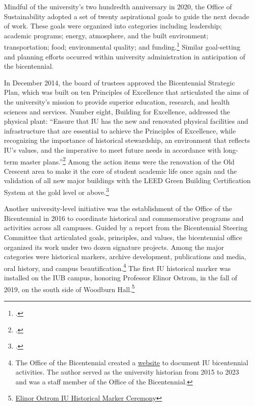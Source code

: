 \documentclass[
  american,
  letterpaper,
]{scrreprt}
\begin{document}
Mindful of the university's two hundredth anniversary in 2020, the
Office of Sustainability adopted a set of twenty aspirational goals to
guide the next decade of work. These goals were organized into
categories including leadership; academic programs; energy, atmosphere,
and the built environment; transportation; food; environmental quality;
and funding.\footnote{.}
Similar goal-setting and planning efforts occurred within university
administration in anticipation of the bicentennial.

In December 2014, the board of trustees approved the Bicentennial
Strategic Plan, which was built on ten Principles of Excellence that
articulated the aims of the university's mission to provide superior
education, research, and health sciences and services. Number eight,
Building for Excellence, addressed the physical plant: ``Ensure that IU
has the new and renovated physical facilities and infrastructure that
are essential to achieve the Principles of Excellence, while recognizing
the importance of historical stewardship, an environment that reflects
IU's values, and the imperative to meet future needs in accordance with
long-term master plans.''\footnote{.}
Among the action items were the renovation of the Old Crescent area to
make it the core of student academic life once again and the validation
of all new major buildings with the LEED Green Building Certification
System at the gold level or above.\footnote{.}

Another university-level initiative was the establishment of the Office
of the Bicentennial in 2016 to coordinate historical and commemorative
programs and activities across all campuses. Guided by a report from the
Bicentennial Steering Committee that articulated goals, principles, and
values, the bicentennial office organized its work under two dozen
signature projects. Among the major categories were historical markers,
archive development, publications and media, oral history, and campus
beautification.\footnote{The Office of the Bicentennial created a
  \href{https://web.archive.org/web/20170427181106/https://200.iu.edu/}{website}
  to document IU bicentennial activities. The author served as the
  university historian from 2015 to 2023 and was a staff member of the
  Office of the Bicentennial.} The first IU historical marker was
installed on the IUB campus, honoring Professor Elinor Ostrom, in the
fall of 2019, on the south side of Woodburn Hall.\footnote{\href{https://web.archive.org/web/20210624095353/https://honorsandawards.iu.edu/awards/honoree/1071.html}{Elinor
  Ostrom IU Historical Marker Ceremony}}
\end{document}
